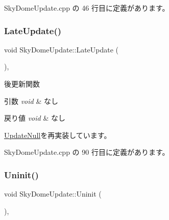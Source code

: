  Sky\+Dome\+Update.\+cpp の 46 行目に定義があります。

\mbox{\label{class_sky_dome_update_a94347cb50b4dc13528738a7b812da261}} 
\subsubsection{\texorpdfstring{Late\+Update()}{LateUpdate()}}
{\footnotesize\ttfamily void Sky\+Dome\+Update\+::\+Late\+Update (\begin{DoxyParamCaption}{ }\end{DoxyParamCaption})\hspace{0.3cm}{\ttfamily [override]}, {\ttfamily [virtual]}}



後更新関数 


\begin{DoxyParams}{引数}
{\em void} & なし \\
\hline
\end{DoxyParams}

\begin{DoxyRetVals}{戻り値}
{\em void} & なし \\
\hline
\end{DoxyRetVals}


\mbox{\hyperlink{class_update_null_ac68da1ba7f3fbcae833442bb1c169200}{Update\+Null}}を再実装しています。



 Sky\+Dome\+Update.\+cpp の 90 行目に定義があります。

\mbox{\label{class_sky_dome_update_a54da74ef017a22075ce473abe1345489}} 
\subsubsection{\texorpdfstring{Uninit()}{Uninit()}}
{\footnotesize\ttfamily void Sky\+Dome\+Update\+::\+Uninit (\begin{DoxyParamCaption}{ }\end{DoxyParamCaption})\hspace{0.3cm}{\ttfamily [override]}, {\ttfamily [virtual]}}



